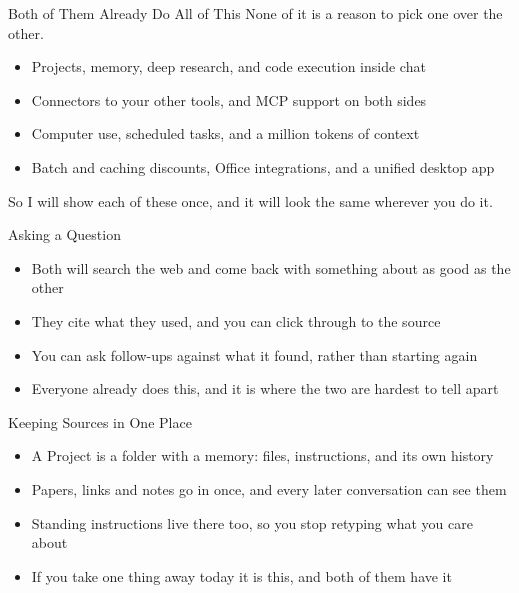 \documentclass[aspectratio=169]{beamer}
\begin{document}
\begin{frame}{Both of Them Already Do All of This}
    None of it is a reason to pick one over the other.

    \vspace{0.8em}
    \begin{itemize}\setlength{\itemsep}{5pt}
        \item Projects, memory, deep research, and code execution inside chat
        \item Connectors to your other tools, and MCP support on both sides
        \item Computer use, scheduled tasks, and a million tokens of context
        \item Batch and caching discounts, Office integrations, and a unified desktop app
    \end{itemize}

    \vspace{1em}
    So I will show each of these once, and it will look the same wherever you do it.
\end{frame}

\begin{frame}{Asking a Question}
    \begin{itemize}
        \item Both will search the web and come back with something about as good as the other
        \item They cite what they used, and you can click through to the source
        \item You can ask follow-ups against what it found, rather than starting again
        \item Everyone already does this, and it is where the two are hardest to tell apart
    \end{itemize}
\end{frame}

\begin{frame}{Keeping Sources in One Place}
    \begin{itemize}
        \item A Project is a folder with a memory: files, instructions, and its own history
        \item Papers, links and notes go in once, and every later conversation can see them
        \item Standing instructions live there too, so you stop retyping what you care about
        \item If you take one thing away today it is this, and both of them have it
    \end{itemize}
\end{frame}
\end{document}
